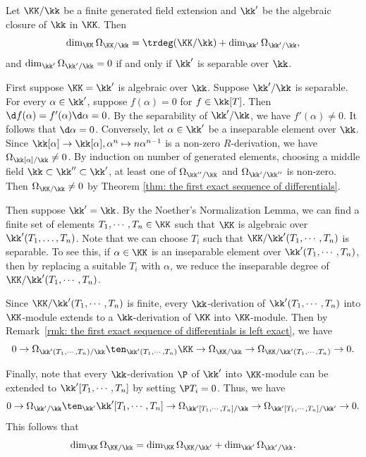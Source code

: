     \begin{example}\label{eg: module of differential for field extensions}
        Let \(\KK/\kk\) be a finite generated field extension and \(\kk'\) be the algebraic closure of \(\kk\) in \(\KK\).
        Then 
        \[ \dim_\KK \Omega_{\KK/\kk} = \trdeg(\KK/\kk) + \dim_{\kk'} \Omega_{\kk'/\kk}, \]
        and \(\dim_{\kk'} \Omega_{\kk'/\kk} = 0\) if and only if \(\kk'\) is separable over \(\kk\).


        First suppose \(\KK = \kk'\) is algebraic over \(\kk\).
        Suppose \(\kk'/\kk\) is separable.
        For every \(\alpha \in \kk'\), suppose \(f(\alpha) = 0\) for \(f \in \kk[T]\).
        Then \(\d f(\alpha) = f'(\alpha) \d \alpha = 0\).
        By the separability of \(\kk'/\kk\), we have \(f'(\alpha) \neq 0\).
        It follows that \(\d \alpha = 0\).
        Conversely, let \(\alpha \in \kk'\) be a inseparable element over \(\kk\).
        Since \(\kk[\alpha] \to \kk[\alpha], \alpha^n \mapsto n\alpha^{n-1}\) is a non-zero \(R\)-derivation, we have \(\Omega_{\kk[\alpha]/\kk} \neq 0\).
        By induction on number of generated elements, choosing a middle field \(\kk \subset \kk'' \subset \kk'\), at least one of \(\Omega_{\kk''/\kk}\) and \(\Omega_{\kk'/\kk''}\) is non-zero.
        Then \(\Omega_{\KK/\kk} \neq 0\) by Theorem \ref{thm: the first exact sequence of differentials}.

        Then suppose \(\kk' = \kk\).
        By the Noether's Normalization Lemma, we can find a finite set of elements \(T_1, \cdots, T_n \in \KK\) such that \(\KK\) is algebraic over \(\kk'(T_1, \ldots, T_n)\).
        Note that we can choose \(T_i\) such that \(\KK/\kk'(T_1, \cdots, T_n)\) is separable.
        To see this, if \(\alpha \in \KK\) is an inseparable element over \(\kk'(T_1,\cdots,T_n)\), 
        then by replacing a suitable \(T_i\) with \(\alpha\), we reduce the inseparable degree of \(\KK/\kk'(T_1, \cdots, T_n)\).
        
        Since \(\KK/\kk'(T_1, \cdots, T_n)\) is finite, every \(\kk\)-derivation of \(\kk'(T_1,\cdots,T_n)\) into \(\KK\)-module extends to a \(\kk\)-derivation of \(\KK\) into \(\KK\)-module.
        Then by Remark~\ref{rmk: the first exact sequence of differentials is left exact}, we have 
        \[ 0 \to \Omega_{\kk'(T_1, \cdots, T_n)/\kk} \ten_{\kk'(T_1,\cdots,T_n)} \KK \to \Omega_{\KK/\kk} \to \Omega_{\KK/\kk'(T_1,\cdots,T_n)} \to 0. \]
        
        Finally, note that every \(\kk\)-derivation \(\P\) of \(\kk'\) into \(\KK\)-module can be extended to \(\kk'[T_1,\cdots,T_n]\) by setting \(\P T_i = 0\).
        Thus, we have 
        \[ 0 \to \Omega_{\kk'/\kk} \ten_{\kk'} \kk'[T_1,\cdots,T_n] \to \Omega_{\kk'[T_1,\cdots,T_n]/\kk} \to \Omega_{\kk'[T_1,\cdots,T_n]/\kk'} \to 0. \]
        This follows that 
        \[ \dim_\KK \Omega_{\KK/\kk} = \dim_{\KK} \Omega_{\KK/\kk'} + \dim_{\kk'}\Omega_{\kk'/\kk}. \]
    \end{example}


